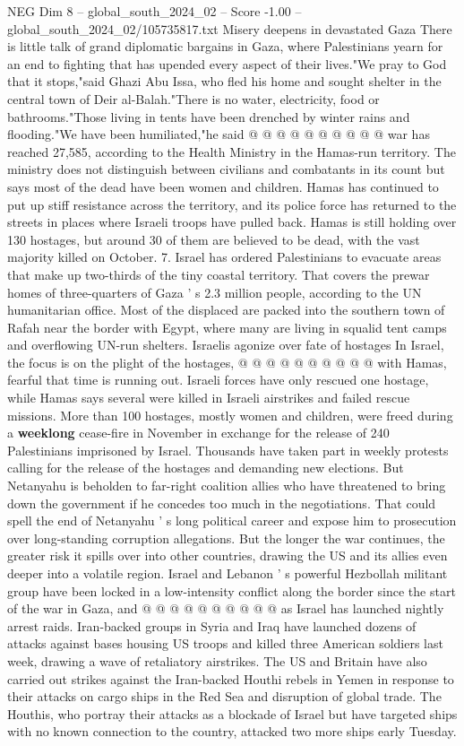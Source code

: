 \begin{textsample}{NEG Dim 8 – global\_south\_2024\_02 – Score -1.00 – global\_south\_2024\_02/105735817.txt}
Misery deepens in devastated Gaza There is little talk of grand diplomatic bargains in Gaza, where Palestinians yearn for an end to fighting that has upended every aspect of their lives."We pray to God that it stops,"said Ghazi Abu Issa, who fled his home and sought shelter in the central town of Deir al-Balah."There is no water, electricity, food or bathrooms."Those living in tents have been drenched by winter rains and flooding."We have been humiliated,"he said @ @ @ @ @ @ @ @ @ @ war has reached 27,585, according to the Health Ministry in the Hamas-run territory.
The ministry does not distinguish between civilians and combatants in its count but says most of the dead have been women and children.
Hamas has continued to put up stiff resistance across the territory, and its police force has returned to the streets in places where Israeli troops have pulled back.
Hamas is still holding over 130 hostages, but around 30 of them are believed to be dead, with the vast majority killed on October. 7.
Israel has ordered Palestinians to evacuate areas that make up two-thirds of the tiny coastal territory.
That covers the prewar homes of three-quarters of Gaza ' s 2.3 million people, according to the UN humanitarian office.
Most of the displaced are packed into the southern town of Rafah near the border with Egypt, where many are living in squalid tent camps and overflowing UN-run shelters.
Israelis agonize over fate of hostages In Israel, the focus is on the plight of the hostages, @ @ @ @ @ @ @ @ @ @ with Hamas, fearful that time is running out.
Israeli forces have only rescued one hostage, while Hamas says several were killed in Israeli airstrikes and failed rescue missions.
More than 100 hostages, mostly women and children, were freed during a \textbf{weeklong} cease-fire in November in exchange for the release of 240 Palestinians imprisoned by Israel.
Thousands have taken part in weekly protests calling for the release of the hostages and demanding new elections.
But Netanyahu is beholden to far-right coalition allies who have threatened to bring down the government if he concedes too much in the negotiations.
That could spell the end of Netanyahu ' s long political career and expose him to prosecution over long-standing corruption allegations.
But the longer the war continues, the greater risk it spills over into other countries, drawing the US and its allies even deeper into a volatile region.
Israel and Lebanon ' s powerful Hezbollah militant group have been locked in a low-intensity conflict along the border since the start of the war in Gaza, and @ @ @ @ @ @ @ @ @ @ as Israel has launched nightly arrest raids.
Iran-backed groups in Syria and Iraq have launched dozens of attacks against bases housing US troops and killed three American soldiers last week, drawing a wave of retaliatory airstrikes.
The US and Britain have also carried out strikes against the Iran-backed Houthi rebels in Yemen in response to their attacks on cargo ships in the Red Sea and disruption of global trade.
The Houthis, who portray their attacks as a blockade of Israel but have targeted ships with no known connection to the country, attacked two more ships early Tuesday.

\end{textsample}
